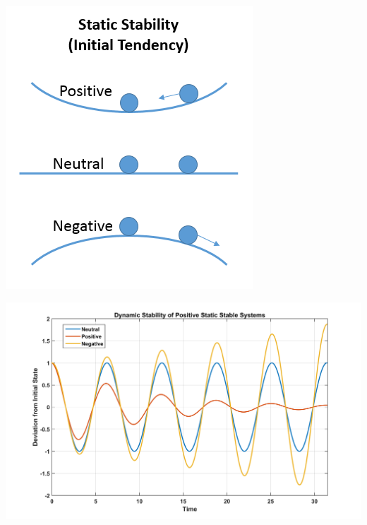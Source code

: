 \documentclass[11pt]{article}
\begin{document}
\begin{minipage}{0.38\textwidth}
	\centering
	\includegraphics[width=\textwidth]{Graphics/static_stability.PNG}
\end{minipage}
\begin{minipage}{0.58\textwidth}
	\centering
	\includegraphics[width=\textwidth]{Graphics/dynamic_stability.png}
\end{minipage}
\end{document}
